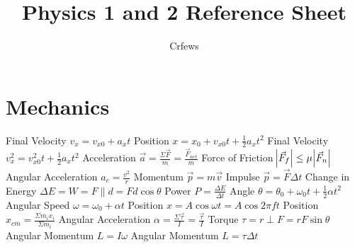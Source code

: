 \documentclass[11pt]{article}
\begin{document}
    \title{Physics 1 and 2 Reference Sheet}
    \author{Crfews}
    \maketitle

    \section{Mechanics}
    Final Velocity $v_{x} = v_{x0} + a_{x}t$\newline
    Position $x = x_{0} + v_{x0}t+\frac{1}{2}a_{x}t^{2}$\newline
    Final Velocity $v^{2}_{x} = v^{2}_{x0}t + \frac{1}{2}a_{x}t^{2}$\newline
    Acceleration $\vec{a} = \frac{\Sigma\vec{F}}{m} = \frac{\vec{F}_{net}}{m}$ \newline
    Force of Friction $\abs{\vec{F}_{f}} \leq \mu\abs{\vec{F}_{n}}$\newline
    Angular Acceleration $a_{c} = \frac{v^{2}}{r}$\newline
    Momentum $\vec{p} = m\vec{v}$\newline
    Impulse $\vec{p} = \vec{F}\Delta t$\newline
    Change in Energy $\Delta E = W = F\parallel d = Fd\cos{\theta}$\newline
    Power $P = \frac{\Delta E}{\Delta t}$\newline
    Angle $\theta = \theta_{0} + \omega_{0}t + \frac{1}{2}\alpha t^{2}$\newline
    Angular Speed $\omega = \omega_{0} + \alpha t$\newline
    Position $x = A\cos{\omega t} = A\cos{2\pi ft}$\newline
    Position $x_{cm} = \frac{\Sigma m_{i}x_{i}}{\Sigma m_{i}}$\newline
    Angular Acceleration $\alpha = \frac{\Sigma\vec{\tau}}{I} = \frac{\vec{\tau}}{I}$\newline
    Torque $\tau = r\perp F = rF\sin{\theta}$\newline
    Angular Momentum $L = I\omega$\newline
    Angular Momentum $L = \tau \Delta t$\newline
\end{document}
